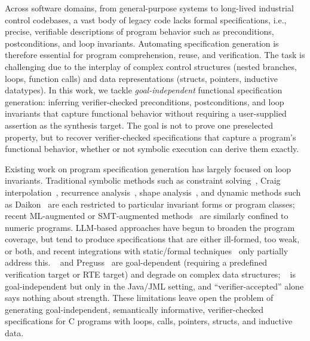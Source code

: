 

Across software domains, from general-purpose systems to long-lived industrial control codebases, a vast body of legacy code lacks formal specifications, i.e., precise, verifiable descriptions of program behavior such as preconditions, postconditions, and loop invariants. Automating specification generation is therefore essential for program comprehension, reuse, and verification. The task is challenging due to the interplay of complex control structures (nested branches, loops, function calls) and data representations (structs, pointers, inductive datatypes). In this work, we tackle \emph{goal-independent} functional specification generation: inferring verifier-checked preconditions, postconditions, and loop invariants that capture functional behavior without requiring a user-supplied assertion as the synthesis target. The goal is not to prove one preselected property, but to recover verifier-checked specifications that capture a program's functional behavior, whether or not symbolic execution can derive them exactly.

Existing work on program specification generation has largely focused on loop invariants. Traditional symbolic methods such as constraint solving~\cite{DBLP:conf/cav/ColonSS03,DBLP:journals/pacmpl/LiuFYSL22}, Craig interpolation~\cite{FiB_Squeezing_loop,DBLP:conf/cade/GanDXZKC16,Nonlinear_Craig_Interpolant_Generation}, recurrence analysis~\cite{beyer2024decomposing,wonisch2012predicate}, shape analysis~\cite{calcagno2009compositional}, and dynamic methods such as Daikon~\cite{Daikon} are each restricted to particular invariant forms or program classes; recent ML-augmented or SMT-augmented methods~\cite{Code2Inv_a_Deep_Learning_Framework_for_Program_Verification,Loop_Invariant_Inference_through_SMT_Solving_Enhanced_Reinforcement_Learning,DBLP:journals/pacmse/CaoWXYWCM25} are similarly confined to numeric programs. LLM-based approaches have begun to broaden the program coverage, but tend to produce specifications that are either ill-formed, too weak, or both, and recent integrations with static/formal techniques~\cite{autospec,Enhancing_Automated_Loop_Invariant_Generation_for_Complex_Programs_with_Large_Language_Models,SpecGen,Wang2025ATO} only partially address this. \autospec~\cite{autospec} and Preguss~\cite{Wang2025ATO} are goal-dependent (requiring a predefined verification target or RTE target) and degrade on complex data structures; \specgen~\cite{SpecGen} is goal-independent but only in the Java/JML setting, and ``verifier-accepted'' alone says nothing about strength. These limitations leave open the problem of generating goal-independent, semantically informative, verifier-checked specifications for C programs with loops, calls, pointers, structs, and inductive data.


